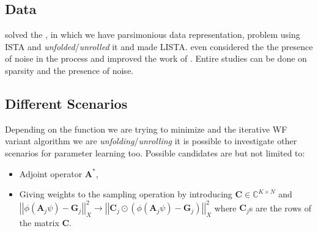 \subsection*{Data}

\cite{Daubechies2003} solved the \srp\index{\srp}, in which we have parsimonious  
\cite{Foucart2013} data representation, problem using \ac{ISTA} and \cite{Gregor2010} 
\emph{unfolded}/\emph{unrolled} it and made \ac{LISTA}. 
\cite{Aberdam2020} even considered the the presence of noise in the process and improved the work of \cite{Gregor2010}. 
Entire studies can be done on sparsity and the presence of noise.

\subsection*{Different Scenarios}

Depending on the function we are trying to minimize and the iterative \ac{WF}\cite{Jaganathan2015}\cite{Liu2019} variant algorithm we are \emph{unfolding}/\emph{unrolling} 
it is possible to investigate other scenarios for parameter learning too. Possible candidates are but not limited to:
\begin{itemize}
  \item Adjoint operator $\boldsymbol{A}^*$,
  \item Giving weights to the sampling operation by introducing $\boldsymbol{C}\in \mathbb{C}^{K\times N}$ and $\left|\left|\phi(\boldsymbol{A}_j\psi)-\boldsymbol{G}_j\right|\right|_X^2 \rightarrow \left|\left|\boldsymbol{C}_j \odot \left(\phi(\boldsymbol{A}_j\psi)-\boldsymbol{G}_j\right)\right|\right|_X^2$ where $\boldsymbol{C}_j$s are the rows of the matrix $\boldsymbol{C}$.
\end{itemize}

















